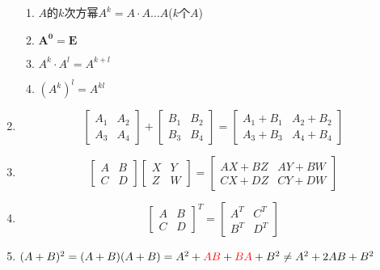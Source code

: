 \documentclass[a4paper,12pt]{article}
\begin{document}
\begin{enumerate}
\begin{enumerate}
            \item $A$的$k$次方幂$A^k = A \cdot A \dots A$($k$个$A$)
            \item $\mathbf{A^0 = E}$
            \item $A^k \cdot A^l = A^{k+l}$
            \item $(A^k)^l = A^{kl}$
        \end{enumerate}
        \item
        \[
            \begin{bmatrix}
                A_1 & A_2 \\
                A_3 & A_4
            \end{bmatrix}
            + \begin{bmatrix}
                  B_1 & B_2 \\
                  B_3 & B_4
            \end{bmatrix}
            = \begin{bmatrix}
                  A_1 + B_1 & A_2 + B_2 \\
                  A_3 + B_3 & A_4 + B_4
            \end{bmatrix}
        \]
        \item
        \[
            \begin{bmatrix}
                A & B \\
                C & D
            \end{bmatrix}
            \begin{bmatrix}
                X & Y \\
                Z & W
            \end{bmatrix}
            = \begin{bmatrix}
                  AX + BZ & AY + BW \\
                  CX + DZ & CY + DW
            \end{bmatrix}
        \]
        \item
        \[
            \begin{bmatrix}
                A & B \\
                C & D
            \end{bmatrix}^{T}
            = \begin{bmatrix}
                  A^T & C^T \\
                  B^T & D^T
            \end{bmatrix}
        \]
        \item $(A + B)^2 = (A + B)(A + B) = A^2 + {\color{red}{AB}} + {\color{red}{BA}} + B^2 \;\mathbf{\neq}\; A^2 + 2AB + B^2$

\end{enumerate}
\end{document}
